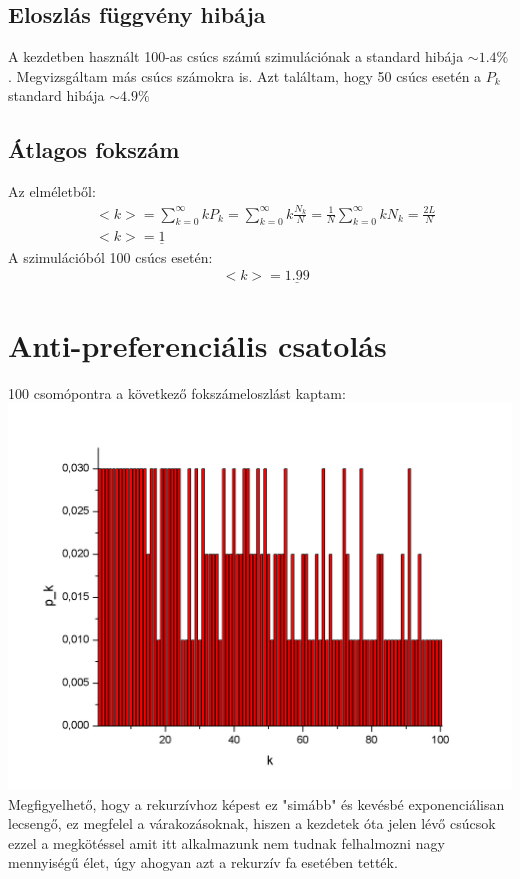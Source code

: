 \documentclass[paper=a4, fontsize=11pt]{article}
\begin{document}
\subsection{Eloszlás függvény hibája}
A kezdetben használt 100-as csúcs számú szimulációnak a standard hibája $\sim 1.4 \%$. Megvizsgáltam más csúcs számokra is. Azt találtam, hogy 50 csúcs esetén a $P_k$ standard hibája  $\sim 4.9 \%$





\subsection{Átlagos fokszám}



Az elméletből:
\begin{align}
&<k>=\sum_{k=0}^\infty kP_k=\sum_{k=0}^\infty k\frac{N_k}{N}=\frac{1}{N}\sum_{k=0}^\infty kN_k=\frac{2L}{N}\\
&<k>=\underline{1}
\end{align}
A szimulációból 100 csúcs esetén:
\begin{align}
&<k>=\underline{1.99}
\end{align}






\newpage


\section{Anti-preferenciális csatolás}
100 csomópontra a következő fokszámeloszlást kaptam:
\includegraphics[width=\textwidth]{antipk}
Megfigyelhető, hogy a rekurzívhoz képest ez "simább" és kevésbé exponenciálisan lecsengő, ez megfelel a várakozásoknak, hiszen a kezdetek óta jelen lévő csúcsok ezzel a megkötéssel amit itt alkalmazunk nem tudnak felhalmozni nagy mennyiségű élet, úgy ahogyan azt a rekurzív fa esetében tették.
\end{document}
